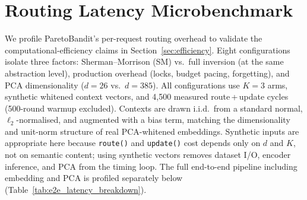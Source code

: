 
\section{Routing Latency Microbenchmark}
\label{sec:latency_benchmark}

We profile ParetoBandit's per-request routing overhead to validate the
computational-efficiency claims in Section~\ref{sec:efficiency}.
Eight configurations isolate three factors: Sherman--Morrison (SM) vs.\
full inversion (at the same abstraction level), production overhead
(locks, budget pacing, forgetting), and PCA dimensionality
($d{=}26$ vs.\ $d{=}385$).
All configurations use $K{=}3$ arms, synthetic whitened context
vectors, and 4{,}500 measured route\,+\,update cycles (500-round
warmup excluded).
Contexts are drawn i.i.d.\ from a standard normal,
$\ell_2$-normalised, and augmented with a bias term, matching the
dimensionality and unit-norm structure of real PCA-whitened embeddings.
Synthetic inputs are appropriate here because \texttt{route()} and
\texttt{update()} cost depends only on $d$ and $K$, not on semantic
content; using synthetic vectors removes dataset I/O, encoder
inference, and PCA from the timing loop.
The full end-to-end pipeline including embedding and PCA is profiled
separately below (Table~\ref{tab:e2e_latency_breakdown}).

